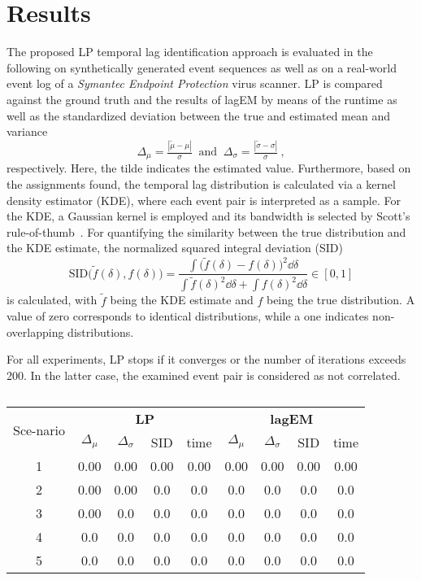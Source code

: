 \documentclass[journal, 10pt]{IEEEtran}
\begin{document}
\section{Results}
\label{sec:results}
%
The proposed LP temporal lag identification approach is evaluated in the following on synthetically generated event sequences as well as on a real-world event log of a \emph{Symantec Endpoint Protection} virus scanner. LP is compared against the ground truth and the results of lagEM by means of the runtime as well as
the standardized deviation between the true and estimated mean and variance
%
\begin{equation}
	\Delta_\mu = \tfrac{|\tilde \mu - \mu|}{\sigma}~\text{ and }~\Delta_\sigma = \tfrac{|\tilde \sigma - \sigma|}{\sigma}~,
	\label{eq:std-deviation}
\end{equation}
%
respectively. Here, the tilde indicates the estimated value. 
Furthermore, based on the assignments found, the temporal lag distribution is calculated via a kernel density estimator (KDE), where each event pair is interpreted as a sample. For the KDE, a Gaussian kernel is employed and its bandwidth is selected by Scott's rule-of-thumb~\cite{Scott1992}. For quantifying the similarity between the true distribution and the KDE estimate, the normalized squared integral deviation (SID)~\cite{Fusion08_Huber_PGMR}
%
\begin{equation}
	\text{SID}\big(\tilde f(\delta), f(\delta)\big) = \frac{\int \big(\tilde f(\delta) - f(\delta)\big)^2 \dd \delta}{\int \tilde f(\delta)^2\dd \delta + \int f(\delta)^2 \dd \delta} \in [0,1]
\label{eq:}
\end{equation}
%
is calculated, with $\tilde f$ being the KDE estimate and $f$ being the true distribution. A value of zero corresponds to identical distributions, while a one indicates non-overlapping distributions.

For all experiments, LP stops if it converges or the number of iterations exceeds 200. In the latter case, the examined event pair is considered as not correlated.

\begin{table}%
\centering
\caption{}
\label{}
\begin{tabular}{c|cccc|cccc}
\multirow{2}{5mm}{Sce-nario} & \multicolumn{4}{c|}{\textbf{LP}} & \multicolumn{4}{c}{\textbf{lagEM}}
\\
 & $\Delta_\mu$ & $\Delta_\sigma$ & SID & time & $\Delta_\mu$ & $\Delta_\sigma$ & SID & time
\\ \hline
 1 & 0.00 & 0.00 & 0.00 & 0.00 & 0.00 & 0.00 & 0.00 & 0.00
\\
 2 & 0.00 & 0.00 & 0.0 & 0.0 & 0.0 & 0.0 & 0.0 & 0.0
\\ \hline
 3 & 0.00 & 0.0 & 0.0 & 0.0 & 0.0 & 0.0 & 0.0 & 0.0
\\
 4 & 0.0 & 0.0 & 0.0 & 0.0 & 0.0 & 0.0 & 0.0 & 0.0
\\
 5 & 0.0 & 0.0 & 0.0 & 0.0 & 0.0 & 0.0 & 0.0 & 0.0
\end{tabular}
\end{table}
\end{document}

